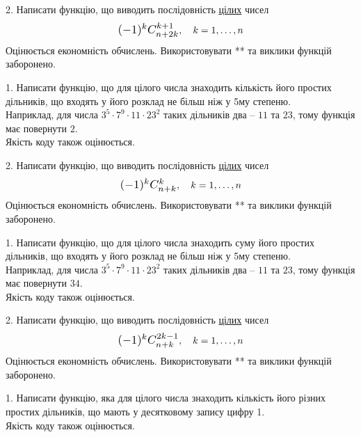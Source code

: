 \documentclass[12pt, ukrainian]{article}
\begin{document}
\begin{Large}
2. 
Написати функцію, що виводить послідовність \underline{цілих} чисел
$$\scalebox{1.2}{$(-1)^{k}C_{n+2k}^{k+1}$}, \quad k=1,\ldots,n$$
Оцінюється економність обчислень. Використовувати ** та виклики функцій заборонено.

\newpage




1. Написати функцію, що для цілого числа знаходить кількість його простих дільників, що входять у його розклад не більш ніж у 5му степеню. \\ Наприклад, для числа $3^5{\cdot}7^9{\cdot}11{\cdot}23^{2}$ таких дільників два – $11$ та $23$, тому функція має повернути $2$.\\	Якість коду також оцінюється. 



\vspace{10mm}

\newpage

2. 
Написати функцію, що виводить послідовність \underline{цілих} чисел
$$\scalebox{1.2}{$(-1)^{k}C_{n+k}^{k}$}, \quad k=1,\ldots,n$$
Оцінюється економність обчислень. Використовувати ** та виклики функцій заборонено.

\newpage




1. Написати функцію, що для цілого числа знаходить суму його простих дільників, що входять у його розклад не більш ніж у 5му степеню. \\ Наприклад, для числа $3^5{\cdot}7^9{\cdot}11{\cdot}23^{2}$ таких дільників два – $11$ та $23$, тому функція має повернути $34$.\\	Якість коду також оцінюється. 



\vspace{10mm}

\newpage

2. 
Написати функцію, що виводить послідовність \underline{цілих} чисел
$$\scalebox{1.2}{$(-1)^{k}C_{n+k}^{2k-1}$}, \quad k=1,\ldots,n$$
Оцінюється економність обчислень. Використовувати ** та виклики функцій заборонено.

\newpage




1. Написати функцію, яка для цілого числа знаходить кількість його різних простих дільників, що мають у десятковому запису цифру 1.\\	Якість коду також оцінюється. 




\end{Large}
\end{document}

